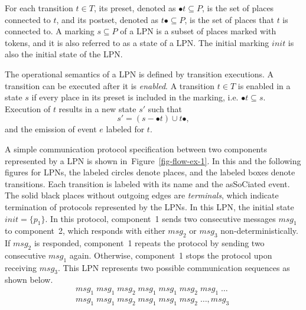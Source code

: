 \documentclass[conference]{IEEEtran}
\begin{document}
For each transition $t \in T$, its preset, denoted as $\bullet{t} \subseteq P$, is the set of places connected to $t$, and its postset, denoted as $t\bullet \subseteq P$, is the set of places that $t$ is connected to.  A marking $s \subseteq P$ of a LPN is a subset of places marked with tokens, and it is also referred to as a state of a LPN.  The initial marking $\mathit{init}$ is also the initial state of the LPN. 

The operational semantics of a LPN is defined by transition executions.  A transition can be executed after it is {\em enabled}.  A transition $t \in T$ is enabled in a state $s$ if every place in its preset is included in the marking, i.e. $\bullet{t} \subseteq s$.  Execution of $t$ results in a new state $s'$ such that 
\[
s' = (s - \bullet{t}) \cup t\bullet,
\]
and the emission of event $e$ labeled for $t$. 


A simple communication protocol specification between two components represented by a LPN is shown in~Figure~\ref{fig-flow-ex-1}.  In this and the following figures for LPNs, the labeled circles denote places, and the labeled boxes denote transitions.  Each transition is labeled with its name and the asSoCiated event.  The solid black places without outgoing edges are {\em terminals}, which indicate termination of protocols represented by the LPNs.  In this LPN, the initial state $\mathit{init} = \{p_1\}$.  In this protocol, component~1 sends two consecutive messages $\mathit{msg}_1$ to component~2, which responds with either $\mathit{msg}_2$ or $\mathit{msg}_3$ non-deterministically.  If $\mathit{msg}_2$ is responded, component~1 repeats the protocol by sending two consecutive $\mathit{msg}_1$ again.  Otherwise, component~1 stops the protocol upon receiving $\mathit{msg}_3$.  This LPN represents two possible communication sequences as shown below.
\[
\begin{array}{l}
\mathit{msg}_1\;\mathit{msg}_1\;\mathit{msg}_2\;\mathit{msg}_1\;\mathit{msg}_1\;\mathit{msg}_2\;\mathit{msg}_1\;\ldots \\
\mathit{msg}_1\;\mathit{msg}_1\;\mathit{msg}_2\;\mathit{msg}_1\;\mathit{msg}_1\;\mathit{msg}_2\;\ldots, \mathit{msg}_3\;
\end{array}
\] 
\end{document}
